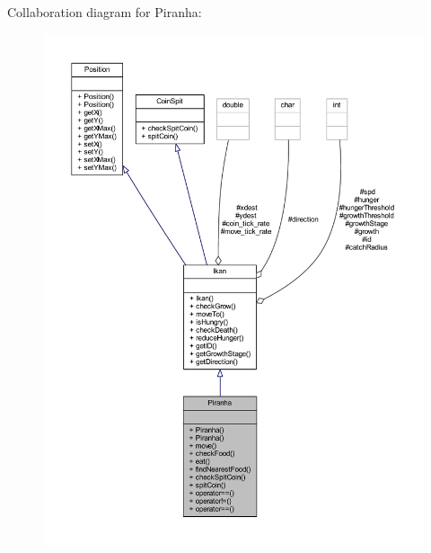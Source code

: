Collaboration diagram for Piranha\+:
\nopagebreak
\begin{figure}[H]
\begin{center}
\leavevmode
\includegraphics[width=350pt]{class_piranha__coll__graph}
\end{center}
\end{figure}
